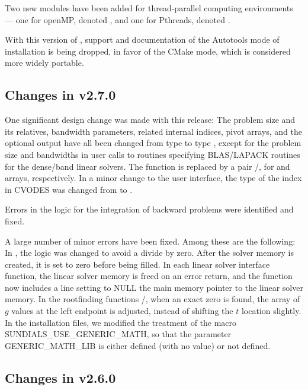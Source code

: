 Two new {\nvector} modules have been added for thread-parallel computing
environments --- one for openMP, denoted ,
and one for Pthreads, denoted .

With this version of {\sundials}, support and documentation of the
Autotools mode of installation is being dropped, in favor of the
CMake mode, which is considered more widely portable.

\subsection*{Changes in v2.7.0}

One significant design change was made with this release: The problem
size and its relatives, bandwidth parameters, related internal indices,
pivot arrays, and the optional output  have all been
changed from type  to type , except for the
problem size and bandwidths in user calls to routines specifying
BLAS/LAPACK routines for the dense/band linear solvers.  The function
 is replaced by a pair /,
for  and  arrays, respectively.  In a minor
change to the user interface, the type of the index  in
CVODES was changed from  to .

Errors in the logic for the integration of backward problems were
identified and fixed.

A large number of minor errors have been fixed.  Among these are the following:
In , the logic was changed to avoid a divide by zero.
After the solver memory is created, it is set to zero before being filled.
In each linear solver interface function, the linear solver memory is
freed on an error return, and the  function now includes a
line setting to NULL the main memory pointer to the linear solver memory.
In the rootfinding functions /, when an exact
zero is found, the array  of $g$ values at the left endpoint is
adjusted, instead of shifting the $t$ location  slightly.
In the installation files, we modified the treatment of the macro
SUNDIALS\_USE\_GENERIC\_MATH, so that the parameter GENERIC\_MATH\_LIB is
either defined (with no value) or not defined.

\subsection*{Changes in v2.6.0}

